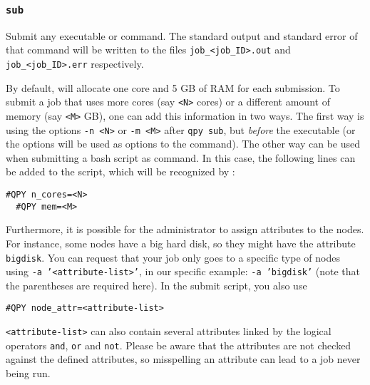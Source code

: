 \documentclass[a4paper,12pt]{article}
\begin{document}
\subsubsection{\texttt{sub}}

Submit any executable or command.
The standard output and standard error of that command will be written to the files \texttt{job\_<job\_ID>.out} and \texttt{job\_<job\_ID>.err} respectively.

By default, \qpy{} will allocate one core and 5 GB of RAM for each submission.
To submit a job that uses more cores (say \texttt{<N>} cores) or a different amount of memory (say \texttt{<M>} GB), one can add this information in two ways.
The first way is using the options \texttt{-n <N>} or \texttt{-m <M>} after \texttt{qpy sub}, but \emph{before} the executable (or the options will be used as options to the command).
The other way can be used when submitting a bash script as command.
In this case, the following lines can be added to the script, which will be recognized by \qpy{}:

\begin{lstlisting}[style=FileStyle]
  #QPY n_cores=<N>
  #QPY mem=<M>
\end{lstlisting}

Furthermore, it is possible for the administrator to assign attributes to the nodes. For instance, some nodes have a big hard disk, so they might have the attribute \texttt{bigdisk}. You can request that your job only goes to a specific type of nodes using \texttt{-a '<attribute-list>'}, in our specific example: \texttt{-a 'bigdisk'} (note that the parentheses are required here). In the submit script, you also use
\begin{lstlisting}[style=FileStyle]
  #QPY node_attr=<attribute-list>
\end{lstlisting}
\texttt{<attribute-list>} can also contain several attributes linked by the logical operators \texttt{and}, \texttt{or} and \texttt{not}. Please be aware that the attributes are not checked against the defined attributes, so misspelling an attribute can lead to a job never being run.
\end{document}
